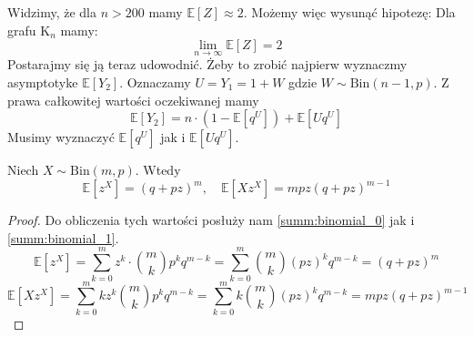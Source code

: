 Widzimy, że dla $n>200$ mamy $\mathbb{E}[Z] \approx 2$. Możemy więc wysunąć hipotezę: Dla grafu $\mathrm{K}_n$ mamy:
\[
    \lim_{n\to\infty} \mathbb{E}[Z] = 2
\]
Postarajmy się ją teraz udowodnić. Żeby to zrobić najpierw wyznaczmy asymptotyke $\mathbb{E}[Y_2]$. Oznaczamy $U=Y_1=1+W$ gdzie $W\sim\mathrm{Bin}(n-1,p)$. Z prawa całkowitej wartości oczekiwanej mamy
\[
    \mathbb{E}[Y_2] = n\cdot (1-\mathbb{E}[q^U])+\mathbb{E}[Uq^U]
\]
Musimy wyznaczyć $\mathbb{E}[q^U]$ jak i $\mathbb{E}[Uq^U]$. 
\begin{lemma}\label{lemma:binomial_PGF}
Niech $X \sim \mathrm{Bin}(m, p)$. Wtedy
\[
    \mathbb{E}[z^X]={(q+pz)}^m, \quad \mathbb{E}[Xz^X]=mpz{(q+pz)}^{m-1}
\]    
\end{lemma}
\begin{proof}
Do obliczenia tych wartości posłuży nam \cref{summ:binomial_0} jak i \cref{summ:binomial_1}.
\[
    \mathbb{E}[z^X] = \sum_{k=0}^{m} z^k \cdot \binom{m}{k}p^k q^{m-k} = \sum_{k=0}^{m} \binom{m}{k}{(pz)}^k q^{m-k} = {(q+pz)}^m
\]    
\[
    \mathbb{E}[Xz^X] = \sum_{k=0}^{m} kz^k \binom{m}{k}p^k q^{m-k} = \sum_{k=0}^{m} k \binom{m}{k}{(pz)}^k q^{m-k} = mpz{(q+pz)}^{m-1} 
\]
\end{proof}

